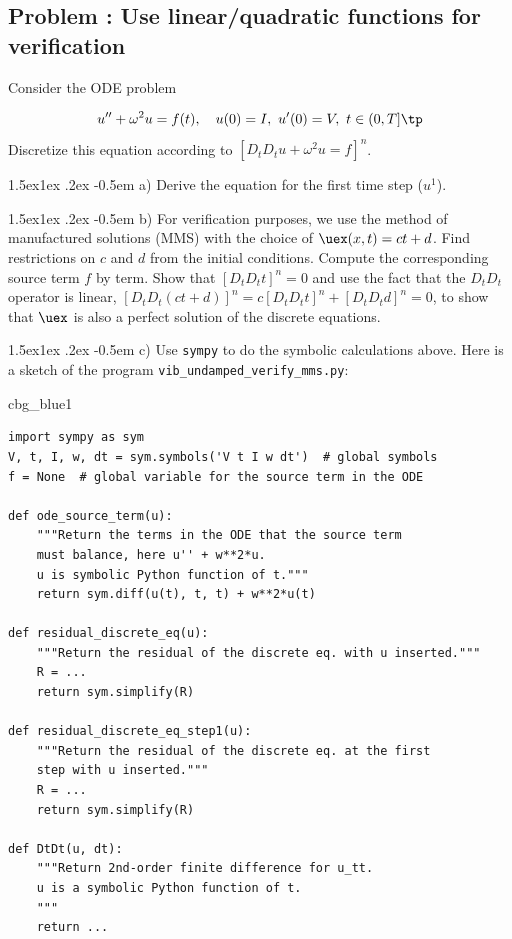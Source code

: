 \documentclass[%
oneside,                 %
final,                   %
10pt]{article}
\makeatletter
\newenvironment{_cod_tight}[1]{
   \def\FrameCommand{\colorbox{#1}}
   \FrameRule0.6pt\MakeFramed {\FrameRestore}\vskip3mm}
   {\vskip0mm\endMakeFramed}
\newenvironment{cod}[1]{
\bgroup\rmfamily
\fboxsep=0mm\relax
\begin{_cod_tight}{#1}
\list{}{\parsep=-2mm\parskip=0mm\topsep=0pt\leftmargin=2mm
\rightmargin=2\leftmargin\leftmargin=4pt\relax}
\item\relax}
{\endlist\end{_cod_tight}\egroup}
\newenvironment{doconceexercise}{}{}
\newcounter{doconceexercisecounter}
\newcommand\subex{\@startsection{paragraph}{4}{\z@}%
                  {1.5ex\@plus1ex \@minus.2ex}%
                  {-0.5em}%
                  {\normalfont\normalsize\bfseries}}
\makeatother
\begin{document}
\begin{doconceexercise}

\subsection*{Problem \thedoconceexercisecounter: Use linear/quadratic functions for verification}

\label{vib:exer:undamped:verify:linquad}

Consider the ODE problem

\[ u^{\prime\prime} + \omega^2u=f(t), \quad u(0)=I,\ u^{\prime}(0)=V,\ t\in(0,T]\tp\]
Discretize this equation according to
$[D_tD_t u + \omega^2 u = f]^n$.


\subex{a)}
Derive the equation for the
first time step ($u^1$).

\subex{b)}
For verification purposes,
we use the method of manufactured solutions (MMS) with the
choice of $\uex(x,t)= ct+d$.
Find restrictions on $c$ and $d$ from
the initial conditions. Compute the corresponding source term $f$ by term.
Show that $[D_tD_t t]^n=0$ and use the fact
that the $D_tD_t$ operator is linear,
$[D_tD_t (ct+d)]^n = c[D_tD_t t]^n + [D_tD_t d]^n = 0$, to show that
$\uex$ is also a perfect solution of the discrete equations.

\subex{c)}
Use \texttt{sympy} to do the symbolic calculations above. Here is a
sketch of the program \Verb!vib_undamped_verify_mms.py!:

\begin{cod}{cbg_blue1}\begin{Verbatim}[numbers=none,fontsize=\fontsize{9pt}{9pt},baselinestretch=0.95,xleftmargin=2mm]
import sympy as sym
V, t, I, w, dt = sym.symbols('V t I w dt')  # global symbols
f = None  # global variable for the source term in the ODE

def ode_source_term(u):
    """Return the terms in the ODE that the source term
    must balance, here u'' + w**2*u.
    u is symbolic Python function of t."""
    return sym.diff(u(t), t, t) + w**2*u(t)

def residual_discrete_eq(u):
    """Return the residual of the discrete eq. with u inserted."""
    R = ...
    return sym.simplify(R)

def residual_discrete_eq_step1(u):
    """Return the residual of the discrete eq. at the first
    step with u inserted."""
    R = ...
    return sym.simplify(R)

def DtDt(u, dt):
    """Return 2nd-order finite difference for u_tt.
    u is a symbolic Python function of t.
    """
    return ...


\end{Verbatim}
\end{cod}
\end{doconceexercise}
\end{document}
